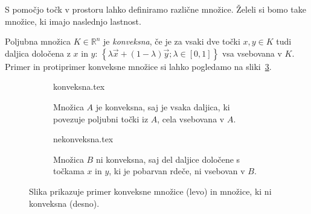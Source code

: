 \documentclass[mat1]{fmfdelo}
\newcommand{\R}{\mathbb R}
\newcommand{\0}{\underline{0}}
\begin{document}
S pomočjo točk v prostoru lahko definiramo različne množice. Želeli si bomo take množice, ki imajo naslednjo lastnost.
\begin{definicija}
Poljubna množica $K \in \R^n$ je \emph{konveksna}, če je za vsaki dve točki $x, y \in K$ tudi daljica določena z $x$ in $y$: 
$\left \{ \lambda \vec{x} + (1 - \lambda) \vec{y}; \lambda \in  [0, 1] \right \}$ 
vsa vsebovana v $K$. Primer in protiprimer konveksne množice si lahko pogledamo na sliki~\ref{fig:konveksnost}.
\begin{figure}[h]  
\centering 
	\begin{subfigure}[b]{0.4\linewidth} 
	\centering
		{konveksna.tex}%
		\caption{Množica $A$ je konveksna, saj je vsaka daljica, ki povezuje poljubni točki iz $A$, cela vsebovana v $A$.}\label{fig:konv}
	\end{subfigure}
	\hspace{1cm}
	\begin{subfigure}[b]{0.4\linewidth}
	\centering
		{nekonveksna.tex}%
		\caption{Množica $B$ ni konveksna, saj del daljice določene s točkama $x$ in $y$, ki je pobarvan rdeče, ni vsebovan v $B$.} \label{fig:nikonv}  
	\end{subfigure}
\caption{Slika prikazuje primer konveksne množice (levo) in množice, ki ni konveksna (desno).}\label{fig:konveksnost} 
\end{figure}
\end{definicija}
\end{document}
